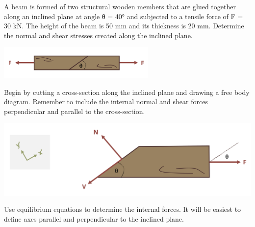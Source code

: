 \documentclass[
  letterpaper,
  DIV=11,
  numbers=noendperiod]{scrreprt}
\begin{document}
\begin{tcolorbox}[enhanced jigsaw, breakable, opacityback=0, toptitle=1mm, left=2mm, colback=white, opacitybacktitle=0.6, colframe=quarto-callout-tip-color-frame, titlerule=0mm, arc=.35mm, leftrule=.75mm, bottomtitle=1mm, colbacktitle=quarto-callout-tip-color!10!white, rightrule=.15mm, title={Example 2.5}, bottomrule=.15mm, toprule=.15mm, coltitle=black]

A beam is formed of two structural wooden members that are glued
together along an inclined plane at angle θ = 40° and subjected to a
tensile force of F = 30 kN. The height of the beam is 50 mm and its
thickness is 20 mm. Determine the normal and shear stresses created
along the inclined plane.

\begin{center}
\includegraphics[width=3.0625in,height=\textheight]{images/CH2 figures/example 2.5 part 1.png}
\end{center}

\begin{tcolorbox}[enhanced jigsaw, breakable, opacityback=0, toptitle=1mm, left=2mm, colback=white, opacitybacktitle=0.6, colframe=quarto-callout-tip-color-frame, titlerule=0mm, arc=.35mm, leftrule=.75mm, bottomtitle=1mm, colbacktitle=quarto-callout-tip-color!10!white, rightrule=.15mm, title={Solution}, bottomrule=.15mm, toprule=.15mm, coltitle=black]

Begin by cutting a cross-section along the inclined plane and drawing a
free body diagram. Remember to include the internal normal and shear
forces perpendicular and parallel to the cross-section.

\begin{center}
\includegraphics{images/CH2 figures/example 2.5 part 1 copy.png}
\end{center}

Use equilibrium equations to determine the internal forces. It will be
easiest to define axes parallel and perpendicular to the inclined plane.


\end{tcolorbox}
\end{tcolorbox}
\end{document}
